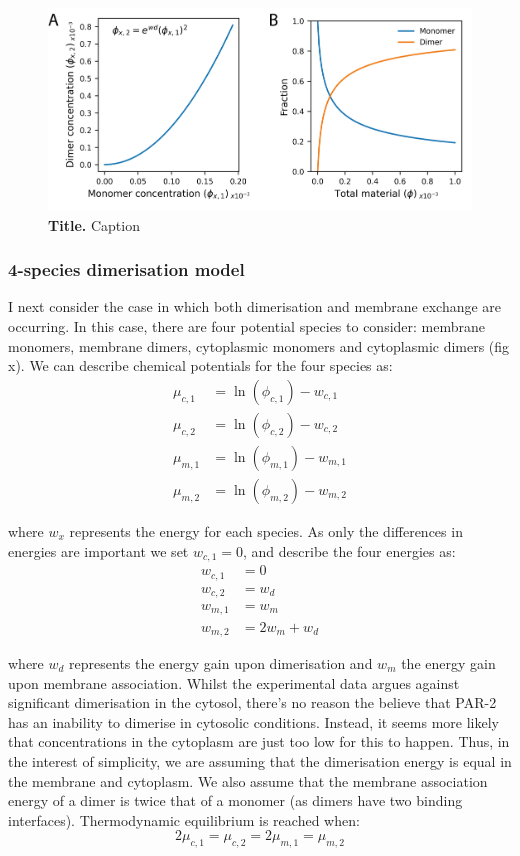 \documentclass[12pt]{"article"}
\newcommand{\mycaption}[2]{\caption[#1]{\textbf{#1.} #2}}
\begin{document}
\begin{figure}[!h]
\includegraphics[scale=1]{thermodynamic_simple_dimer}
\setlength{\abovecaptionskip}{20pt}
\centering
\mycaption{Title}{Caption}
\label{fig:thermodynamic_simple_dimer}
\end{figure}


\subsubsection{4-species dimerisation model}

I next consider the case in which both dimerisation and membrane exchange are occurring. In this case, there are four potential species to consider: membrane monomers, membrane dimers, cytoplasmic monomers and cytoplasmic dimers (fig x). We can describe chemical potentials for the four species as:
\begin{align}
\mu_{c,1} &= \ln(\phi_{c,1}) - w_{c,1}\\
\mu_{c,2} &= \ln(\phi_{c,2}) - w_{c,2}\\
\mu_{m,1} &= \ln(\phi_{m,1}) - w_{m,1}\\
\mu_{m,2} &= \ln(\phi_{m,2}) - w_{m,2}
\end{align}

where $w_x$ represents the energy for each species. As only the differences in energies are important we set $w_{c,1} = 0$, and describe the four energies as:
\begin{align}
w_{c,1} &= 0\\
w_{c,2} &= w_d\\
w_{m,1} &= w_m\\
w_{m,2} &= 2w_m + w_d
\end{align}

where $w_d$ represents the energy gain upon dimerisation and $w_m$ the energy gain upon membrane association. Whilst the experimental data argues against significant dimerisation in the cytosol, there's no reason the believe that PAR-2 has an inability to dimerise in cytosolic conditions. Instead, it seems more likely that concentrations in the cytoplasm are just too low for this to happen. Thus, in the interest of simplicity, we are assuming that the dimerisation energy is equal in the membrane and cytoplasm. We also assume that the membrane association energy of a dimer is twice that of a monomer (as dimers have two binding interfaces). Thermodynamic equilibrium is reached when:
\begin{equation}
2\mu_{c,1} = \mu_{c,2} = 2\mu_{m,1} = \mu_{m,2}
\end{equation}
\end{document}
